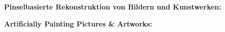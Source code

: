 \thispagestyle{empty}
\begin{center}
  \begin{minipage}[c][0.48\textheight][b]{0.9\textwidth}
    \small
    \textbf{
      Pinselbasierte Rekonstruktion von Bildern und Kunstwerken:
    }\par
    \vspace{\baselineskip}
    
  \end{minipage}\par
  \vfill
  \begin{minipage}[c][0.48\textheight][b]{0.9\textwidth}
    \small
    \textbf{
      Artificially Painting Pictures \& Artworks:
    }\par
    \vspace{\baselineskip}
    
  \end{minipage}
\end{center}
